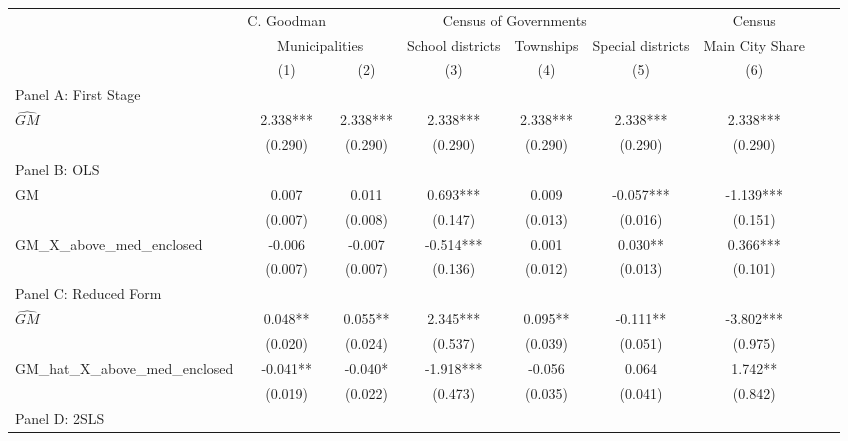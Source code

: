  \begin{tabular}{l*{8}{c}} \toprule
&\multicolumn{1}{c}{C. Goodman}&\multicolumn{4}{c}{Census of Governments}&\multicolumn{1}{c}{Census}\\\cmidrule(lr){2-2}\cmidrule(lr){3-6}\cmidrule(lr){7-7}
&\multicolumn{2}{c}{Municipalities}&\multicolumn{1}{c}{School districts}&\multicolumn{1}{c}{Townships}&\multicolumn{1}{c}{Special districts}&\multicolumn{1}{c}{Main City Share}\\\cmidrule(lr){2-3}\cmidrule(lr){4-6}\cmidrule(lr){7-7}
&\multicolumn{1}{c}{(1)}&\multicolumn{1}{c}{(2)}&\multicolumn{1}{c}{(3)}&\multicolumn{1}{c}{(4)}&\multicolumn{1}{c}{(5)}&\multicolumn{1}{c}{(6)}\\
\cmidrule(lr){1-7}
\multicolumn{6}{l}{Panel A: First Stage}\\
\cmidrule(lr){1-7}
$\widehat{GM}$  &    2.338***&    2.338***&    2.338***&    2.338***&    2.338***&    2.338***\\
                &  (0.290)   &  (0.290)   &  (0.290)   &  (0.290)   &  (0.290)   &  (0.290)   \\
\cmidrule(lr){1-7}
\multicolumn{6}{l}{Panel B: OLS}\\
\cmidrule(lr){1-7}
GM              &    0.007   &    0.011   &    0.693***&    0.009   &   -0.057***&   -1.139***\\
                &  (0.007)   &  (0.008)   &  (0.147)   &  (0.013)   &  (0.016)   &  (0.151)   \\
\addlinespace
GM\_X\_above\_med\_enclosed&   -0.006   &   -0.007   &   -0.514***&    0.001   &    0.030** &    0.366***\\
                &  (0.007)   &  (0.007)   &  (0.136)   &  (0.012)   &  (0.013)   &  (0.101)   \\
\cmidrule(lr){1-7}
\multicolumn{6}{l}{Panel C: Reduced Form}\\
\cmidrule(lr){1-7}
$\widehat{GM}$  &    0.048** &    0.055** &    2.345***&    0.095** &   -0.111** &   -3.802***\\
                &  (0.020)   &  (0.024)   &  (0.537)   &  (0.039)   &  (0.051)   &  (0.975)   \\
\addlinespace
GM\_hat\_X\_above\_med\_enclosed&   -0.041** &   -0.040*  &   -1.918***&   -0.056   &    0.064   &    1.742** \\
                &  (0.019)   &  (0.022)   &  (0.473)   &  (0.035)   &  (0.041)   &  (0.842)   \\
\cmidrule(lr){1-7}
\multicolumn{6}{l}{Panel D: 2SLS}\\

\end{tabular}
